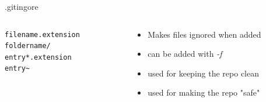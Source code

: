 \documentclass[table,svgnames,aspectratio=169]{beamer}
\begin{document}
\begin{frame}[fragile,label={sec:orgdb0b6ba}]{.gitingore}
 \begin{columns}
\begin{column}{.5\columnwidth}
\lstset{language=bash,label= ,caption= ,captionpos=b,numbers=none}
\begin{lstlisting}
filename.extension 
foldername/
entry*.extension
entry~
\end{lstlisting}
\end{column}


\begin{column}{.5\columnwidth}
\begin{itemize}
\item Makes files ignored when added
\item can be added with \emph{-f}
\item used for keeping the repo clean
\item used for making the repo "safe"
\end{itemize}
\end{column}
\end{columns}
\end{frame}
\end{document}
